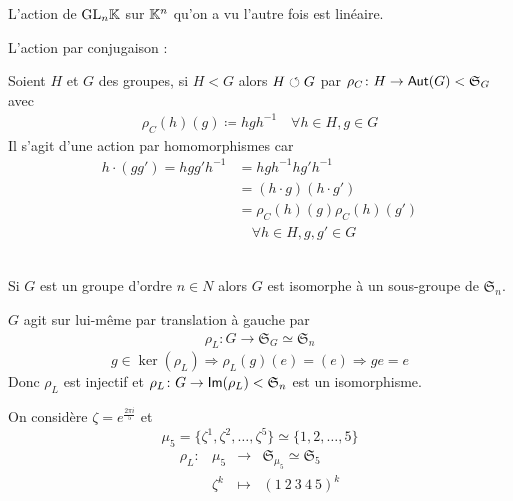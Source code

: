 \documentclass[french,a4paper,10pt]{article}
\begin{document}
	\begin{example}
		L'action de $\text{GL}_{n}{\mathbb{K}}$ sur $\mathbb{K}^n$ qu'on a vu l'autre fois est linéaire.
	\end{example}
	\begin{example}
		L'action par conjugaison :
		
		Soient $H$ et $G$ des groupes, si $H<G$ alors $H\circlearrowleft G$ par $\rho_C\colon H\to\operatorname{\mathsf{Aut}}(G)<\mathfrak{S}_G$ avec
			\[\begin{aligned}
				\rho_C(h)(g)\coloneq hgh^{-1}\quad\forall h\in H,g\in G
			\end{aligned}\]
		Il s'agit d'une action par homomorphismes car
			\[\begin{aligned}
				h\cdot(gg')=hgg'h^{-1}&=hgh^{-1}hg'h^{-1}\\
				&=(h\cdot g)(h\cdot g')\\
				&=\rho_C(h)(g) \rho_C(h)(g')\\&\quad\forall h\in H,g,g'\in G
			\end{aligned}\]
	\end{example}
	\begin{theorem}[Cayley]\,\\
		Si $G$ est un groupe d'ordre $n\in N$ alors $G$ est isomorphe à un sous-groupe de $\mathfrak S_n$.
	\end{theorem}
	\begin{myproof}
		$G$ agit sur lui-même par translation à gauche par 
			\[\begin{aligned}
				\rho_L\colon G\to \mathfrak S_G\simeq\mathfrak S_n
			\end{aligned}\]
			\[
			g\in \ker(\rho_L)\Longrightarrow\rho_L(g)(e)=(e)\Longrightarrow ge=e
			\]
			Donc $\rho_L$ est injectif et $\rho_L\colon G\to \operatorname{\mathsf{Im}}(\rho_L)<\mathfrak S_n$ est un isomorphisme.
	\end{myproof}
	\begin{example}
		On considère $\zeta=e^{\frac{2\pi i}5}$ et 
			\[
				\mu_5=\{\zeta^1,\zeta^2,\dots,\zeta^5\}\simeq\{1,2,\dots,5\}
			\]
			\[\begin{aligned}
				\rho_L\colon&\mu_5&\to &\mathfrak S_{\mu_5}\simeq\mathfrak S_5\\
				&\zeta^k&\mapsto &(1~2~3~4~5)^k
			\end{aligned}\]
	\end{example}
\end{document}
